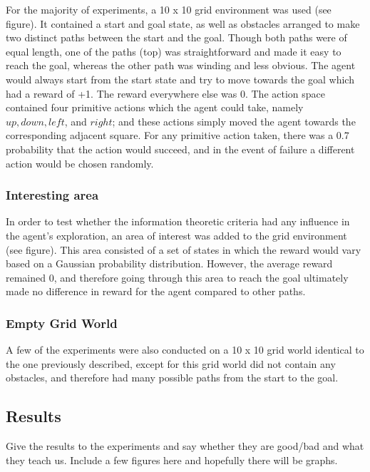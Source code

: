 \documentclass{acm_proc_article-sp}
\begin{document}
For the majority of experiments, a 10 x 10 grid environment was used (see figure). It contained a start and goal state, as well as obstacles arranged to make two distinct paths between the start and the goal. Though both paths were of equal length, one of the paths (top) was straightforward and made it easy to reach the goal, whereas the other path was winding and less obvious. The agent would always start from the start state and try to move towards the goal which had a reward of +1. The reward everywhere else was 0. The action space contained four primitive actions which the agent could take, namely $up, down, left$, and $right$; and these actions simply moved the agent towards the corresponding adjacent square. For any primitive action taken, there was a 0.7 probability that the action would succeed, and in the event of failure a different action would be chosen randomly. 

\subsubsection{Interesting area}

In order to test whether the information theoretic criteria had any influence in the agent's exploration, an area of interest was added to the grid environment (see figure). This area consisted of a set of states in which the reward would vary based on a Gaussian probability distribution. However, the average reward remained 0, and therefore going through this area to reach the goal ultimately made no difference in reward for the agent compared to other paths.

\subsubsection{Empty Grid World}

A few of the experiments were also conducted on a 10 x 10 grid world identical to the one previously described, except for this grid world did not contain any obstacles, and therefore had many possible paths from the start to the goal.

\subsection{Results}

Give the results to the experiments and say whether they are good/bad and what they teach us. Include a few figures here and hopefully there will be graphs.
\end{document}

